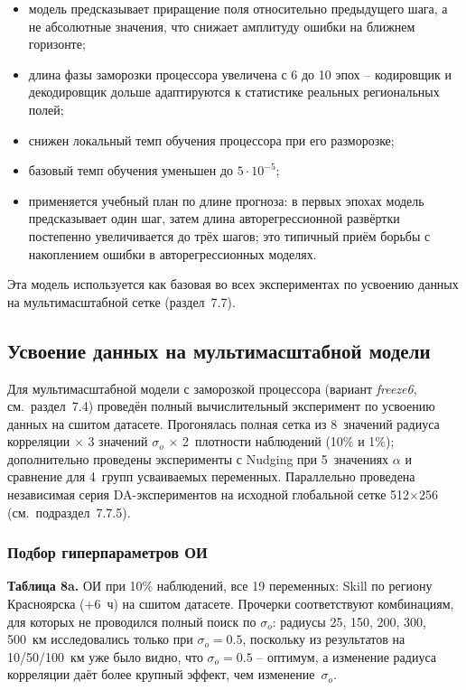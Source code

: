 \documentclass[14pt,a4paper]{extarticle}
\numberwithin{table}{section}
\numberwithin{figure}{section}
\numberwithin{equation}{section}
\providecommand{\tightlist}{%
  \setlength{\itemsep}{0pt}\setlength{\parskip}{0pt}}
\begin{document}
\begin{itemize}
\tightlist
\item
  модель предсказывает приращение поля относительно
  предыдущего шага, а не абсолютные
  значения, что снижает амплитуду ошибки на ближнем горизонте;
\item
  длина фазы заморозки процессора увеличена с 6 до 10 эпох --
  кодировщик и декодировщик дольше адаптируются к статистике
  реальных региональных полей;
\item
  снижен локальный темп обучения процессора при его разморозке;
\item
  базовый темп обучения уменьшен до $5\cdot10^{-5}$;
\item
  применяется учебный план по длине прогноза:
  в первых эпохах модель предсказывает один шаг, затем длина
  авторегрессионной развёртки постепенно увеличивается до трёх шагов;
  это типичный приём борьбы с накоплением ошибки в авторегрессионных
  моделях.
\end{itemize}

Эта модель используется как базовая во всех экспериментах по
усвоению данных на мультимасштабной сетке (раздел~7.7).

\subsection{Усвоение данных на мультимасштабной модели}\label{ux443ux441ux432ux43eux435ux43dux438ux435-ux434ux430ux43dux43dux44bux445-ux43dux430-ux43cux443ux43bux44cux442ux438ux440ux435ux437ux43eux43bux44eux446ux438ux43eux43dux43dux43eux439-ux43cux43eux434ux435ux43bux438}

Для мультимасштабной модели с заморозкой процессора (вариант
\textit{freeze6}, см.~раздел~7.4) проведён полный
вычислительный эксперимент по усвоению данных на сшитом датасете.
Прогонялась полная сетка из 8~значений радиуса корреляции
\(\times\) 3 значений \(\sigma_o\) \(\times\) 2~плотности наблюдений
(10\% и 1\%); дополнительно проведены эксперименты с Nudging при
5~значениях \(\alpha\) и сравнение для 4~групп усваиваемых переменных.
Параллельно проведена независимая серия DA-экспериментов на исходной
глобальной сетке 512$\times$256 (см.~подраздел~7.7.5).

\subsubsection{Подбор гиперпараметров ОИ}

\textbf{Таблица 8a.} ОИ при 10\% наблюдений, все 19 переменных: Skill
по региону Красноярска (+6~ч) на сшитом датасете. Прочерки
соответствуют комбинациям, для которых не проводился полный поиск
по $\sigma_o$: радиусы 25, 150, 200, 300, 500~км исследовались только
при $\sigma_o = 0.5$, поскольку из результатов на 10/50/100~км уже
было видно, что $\sigma_o = 0.5$ -- оптимум, а изменение радиуса
корреляции даёт более крупный эффект, чем изменение~$\sigma_o$.
\end{document}

